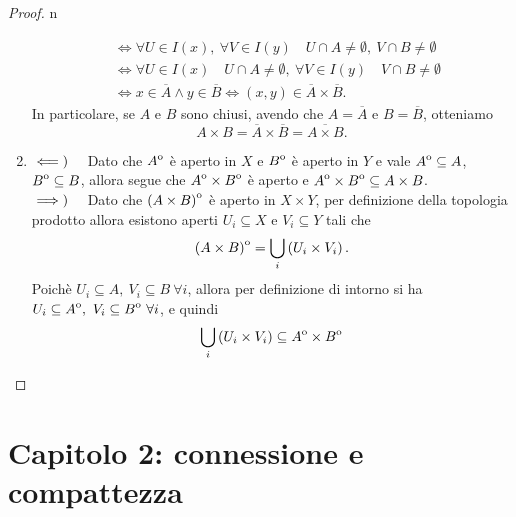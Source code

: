 \begin{proof}{n}
\begin{enumerate}[label=\Roman*]
\begin{align*}
			&\iff \forall U\in I(x),\ \forall V\in I(y)\quad U\cap A\neq \emptyset ,\ V\cap B\neq \emptyset\\
			&\iff \forall U\in I(x)\quad U\cap A\neq \emptyset ,\ \forall V\in I(y)\quad V\cap B\neq \emptyset\\
			&\iff x\in\overline{A}\wedge y\in \overline{B}\iff(x,y)\in\overline{A}\times \overline{B}.
		\end{align*}
		In particolare, se $A$ e $B$ sono chiusi, avendo che $A=\overline{A}$ e $B=\overline{B}$, otteniamo
		\begin{equation*}
			A\times B=\overline{A}\times \overline{B}=\overline{A\times B}.
		\end{equation*}
	\item$\impliedby)\quad$ Dato che ${\kern0ptA}^{\mathrm{o}}$ è aperto in $X$ e ${\kern0ptB}^{\mathrm{o}}$ è aperto in $Y$ e vale ${\kern0ptA}^{\mathrm{o}}\subseteq A$, ${\kern0ptB}^{\mathrm{o}}\subseteq{B}$, allora segue che ${\kern0ptA}^{\mathrm{o}}\times{\kern0ptB}^{\mathrm{o}}$ è aperto e ${\kern0ptA}^{\mathrm{o}}\times{\kern0ptB}^{\mathrm{o}}\subseteq A\times B$.\\
	$\implies)\quad$ Dato che ${\kern0pt\left(A\times B\right)}^{\mathrm{o}}$ è aperto in $X\times Y$, per definizione della topologia prodotto allora esistono aperti $U_i\subseteq X$ e $V_i\subseteq Y$ tali che
	\begin{equation*}
		{\kern0pt\left(A\times B\right)}^{\mathrm{o}}=\bigcup_i\left(U_i\times V_i\right).
	\end{equation*}
	Poichè $U_i\subseteq A,\ V_i\subseteq B\ \forall i$, allora per definizione di intorno si ha $U_i\subseteq\interior{A},\ V_i\subseteq\interior{B}\ \forall i$, e quindi
	\begin{equation*}
		\bigcup_i\left(U_i\times V_i\right)\subseteq {\kern0ptA}^{\mathrm{o}}\times {\kern0ptB}^{\mathrm{o}}\qedhere
	\end{equation*}
	\end{enumerate}
\end{proof}
\section{Capitolo 2: connessione e compattezza}
